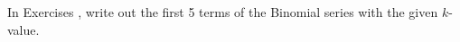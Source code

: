 {\noindent In Exercises}
{, write out the first 5 terms of the Binomial series with the given $k$-value.
}
